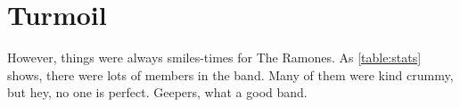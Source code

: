 \section{Turmoil}
\label{intro:turmoil}




However, things were always smiles-times for The Ramones.  As \ref{table:stats}
shows, there were lots of members in the band.  Many of them were kind crummy,
but hey, no one is perfect.  Geepers, what a good band.